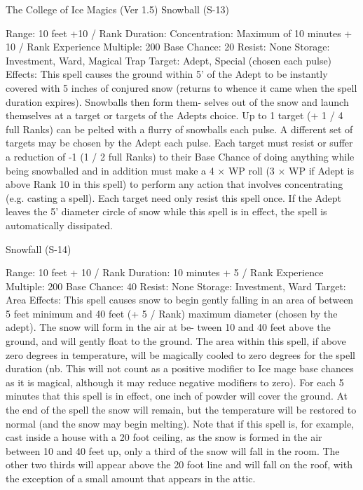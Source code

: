 \begin{Chapter}{The College of Ice Magics (Ver 1.5)}
Snowball (S-13) 

Range: 10 feet +10 / Rank 
Duration: Concentration: Maximum of 10 minutes 
+ 10 / Rank 
Experience Multiple: 200 
Base Chance: 20%
Resist: None 
Storage: Investment, Ward, Magical Trap 
Target: Adept, Special (chosen each pulse) 
Effects:  This  spell  causes  the  ground  within  5’  of 
the Adept to be instantly covered  with 5 inches of 
conjured snow (returns to whence it came when the 
spell duration expires). Snowballs then form them-
selves  out  of  the  snow  and  launch themselves  at  a 
target  or  targets  of  the  Adepts  choice.  Up  to  1 
target  (+  1  /  4  full  Ranks)  can  be  pelted  with  a 
flurry  of  snowballs  each  pulse.  A  different  set  of 
targets  may  be  chosen  by  the  Adept  each  pulse. 
Each target must resist or suffer a reduction of -1%
(1  /  2  full  Ranks)  to  their  Base  Chance  of  doing 
anything  while  being  snowballed  and  in  addition 
must  make  a  4  ×  WP  roll  (3  ×  WP  if  Adept  is 
above Rank 10 in this spell) to perform any action 
that  involves  concentrating  (e.g.  casting  a  spell). 
Each  target  need  only  resist  this  spell  once.  If  the 
Adept  leaves  the  5’  diameter  circle  of  snow  while 
this  spell  is  in  effect,  the  spell  is  automatically 
dissipated. 

Snowfall (S-14) 

Range: 10 feet + 10 / Rank 
Duration: 10 minutes + 5 / Rank 
Experience Multiple: 200 
Base Chance: 40%
Resist: None 
Storage: Investment, Ward 
Target: Area 
Effects:  This  spell  causes  snow  to  begin  gently 
falling  in  an  area  of  between  5  feet  minimum and 
40 feet (+ 5 / Rank) maximum diameter (chosen by 
the  adept).  The  snow  will  form  in  the  air  at  be-
tween  10  and  40  feet  above  the  ground,  and  will 
gently  float  to  the  ground.  The  area  within  this 
spell, if above zero degrees in temperature, will be 
magically  cooled  to  zero  degrees  for  the  spell 
duration  (nb.  This  will  not  count  as  a  positive 
modifier to Ice mage base chances as it is magical, 
although it may reduce negative modifiers to zero). 
For  each  5  minutes  that  this  spell  is  in  effect,  one 
inch of powder will cover the ground. At the end of 
the spell the snow will remain, but the temperature 
will be restored to normal (and the snow may begin 
melting). Note that if this spell is, for example, cast 
inside a house with a 20 foot ceiling, as the snow is 
formed in the air between 10 and 40 feet up, only a 
third  of  the  snow  will  fall  in  the  room.  The  other 
two  thirds  will  appear  above  the  20  foot  line  and 
will fall on the roof,  with the exception of a small 
amount that appears in the attic. 


\end{Chapter}
